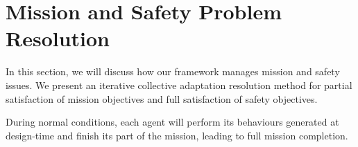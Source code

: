 \documentclass[journal]{IEEEtran}
\theoremstyle{definition}
\begin{document}









\section{Mission and Safety Problem Resolution}

 In this section, we will discuss how our framework manages mission and safety issues. We present an iterative collective adaptation resolution method for partial satisfaction of mission objectives and full satisfaction of safety objectives. 
 
 


During normal conditions, each agent will perform its behaviours generated at design-time and finish its part of the mission, leading to full mission completion.
\end{document}
